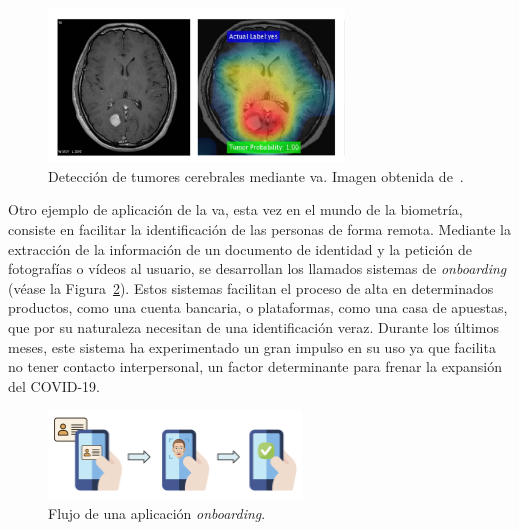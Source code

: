 \begin{figure}[H]
		\begin{center}
			\includegraphics[width=0.7\textwidth]{ figures/intro/tumor.png}
			\caption{Detección de tumores cerebrales mediante \acrshort{va}. Imagen obtenida de~\cite{narayanan2019understanding}.}
			\label{fig.tumor}
		\end{center}
\end{figure}
\vspace{-10pt}

Otro ejemplo de aplicación de la \acrshort{va}, esta vez en el mundo de la biometría, consiste en facilitar la identificación de las personas de forma remota. Mediante la extracción de la información de un documento de identidad y la petición de fotografías o vídeos al usuario, se desarrollan los llamados sistemas de \textit{onboarding} (véase la Figura~\ref{fig.onboarding}). Estos sistemas facilitan el proceso de alta en determinados productos, como una cuenta bancaria, o plataformas, como una casa de apuestas, que por su naturaleza necesitan de una identificación veraz. Durante los últimos meses, este sistema ha experimentado un gran impulso en su uso ya que facilita no tener contacto interpersonal, un factor determinante para frenar la expansión del COVID-19.

\begin{figure}[H]
		\begin{center}
			\includegraphics[width=0.6\textwidth]{ figures/intro/onboarding.png}
			\caption{Flujo de una aplicación \textit{onboarding}.}
			\label{fig.onboarding}
		\end{center}
\end{figure}
\vspace{-10pt}

